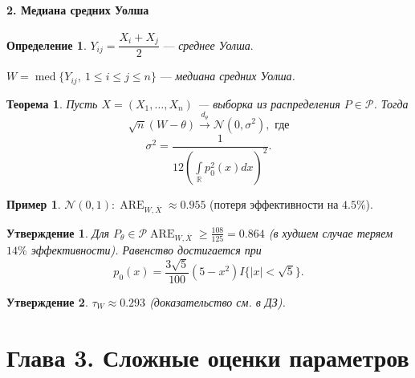 \documentclass[12pt]{report}
\newtheorem{theorem}{Теорема}
\newtheorem{proposition}{Утверждение}
\theoremstyle{definition}
\newtheorem{definition}{Определение}
\newtheorem{example}{Пример}
\begin{document}
\subsubsection{2. Медиана средних Уолша}
\begin{definition}
	$Y_{ij} = \dfrac{X_i + X_j}{2}$ — \emph{среднее Уолша}.

	$W = \operatorname{med} \{Y_{ij},\ 1 \leqslant i \leqslant j \leqslant n\}$ — \emph{медиана средних Уолша.}
\end{definition}
\begin{theorem}
	Пусть $X = (X_1, \dots, X_n)$ — выборка из  распределения $P \in \mathcal{P}$. Тогда
	$$ \sqrt{n}(W - \theta) \xrightarrow{d_\theta} \mathcal{N}(0, \sigma^2), \text{ где}$$
	$$ \sigma^2 = \dfrac{1}{12\left(\int\limits_\mathbb{R} p_0^2(x)dx\right)^2}. $$
\end{theorem}
\begin{example}
	$\mathcal{N}(0,1): \operatorname{ARE}_{W, \overline{X}} \approx 0.955$ (потеря эффективности на $4.5 \%$).
\end{example}
\begin{proposition}
	Для $P_\theta \in \mathcal{P} \operatorname{ARE}_{W, \overline{X}} \geqslant \frac{108}{125} = 0.864$ (в худшем случае теряем $14\%$ эффективности). Равенство достигается при
	$$ p_0(x) = \dfrac{3\sqrt{5}}{100}(5 - x^2)I\{|x| < \sqrt{5}\}.$$
\end{proposition}
\begin{proposition}
	$\tau_{W} \approx 0.293$ (доказательство см. в ДЗ).
\end{proposition} 

\chapter{Глава 3. Сложные оценки параметров}
\end{document}
